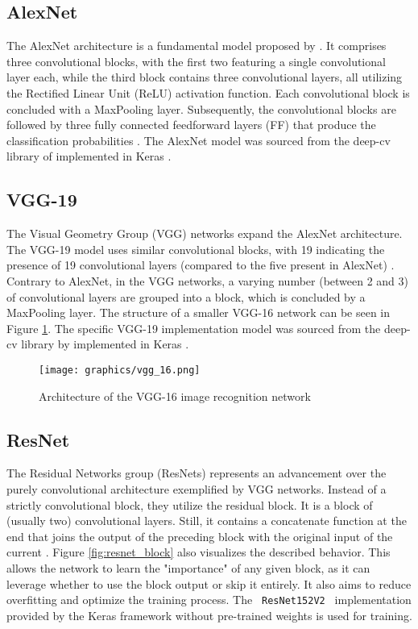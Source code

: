 \documentclass[draft,final]{vutinfth} %
\begin{document}
\subsection{AlexNet}
The AlexNet architecture is a fundamental model proposed by \citeauthor{krizhevsky_imagenet_2012}. It comprises three convolutional blocks, with the first two featuring a single convolutional layer each, while the third block contains three convolutional layers, all utilizing the Rectified Linear Unit (ReLU) activation function. Each convolutional block is concluded with a MaxPooling layer. Subsequently, the convolutional blocks are followed by three fully connected feedforward layers (FF) that produce the classification probabilities \cite{krizhevsky_imagenet_2012}.
The AlexNet model was sourced from the deep-cv library of \citeauthor{weill_keras-deepcv_2017} \cite{weill_keras-deepcv_2017} implemented in Keras \cite{chollet_keras_2015}.

\subsection{VGG-19}
The Visual Geometry Group (VGG) networks expand the AlexNet architecture. The VGG-19 model uses similar convolutional blocks, with 19 indicating the presence of 19 convolutional layers (compared to the five present in AlexNet) \cite{simonyan_very_2015}. 
Contrary to AlexNet, in the VGG networks, a varying number (between 2 and 3) of convolutional layers are grouped into a block, which is concluded by a MaxPooling layer.
The structure of a smaller VGG-16 network can be seen in Figure \ref{fig:vgg16}.
The specific VGG-19 implementation model was sourced from the deep-cv library by \citeauthor{weill_keras-deepcv_2017} \cite{weill_keras-deepcv_2017} implemented in Keras \cite{chollet_keras_2015}.

\begin{figure}
    \centering
    \texttt{[image: graphics/vgg\_16.png]}
    \caption{Architecture of the VGG-16 image recognition network \cite{simonyan_very_2015, bangar_vgg-net_2022}}
    \label{fig:vgg16}
\end{figure}

\subsection{ResNet} \label{sec:meth_resnet}
The Residual Networks group (ResNets) represents an advancement over the purely convolutional architecture exemplified by VGG networks. Instead of a strictly convolutional block, they utilize the residual block. It is a block of (usually two) convolutional layers. Still, it contains a concatenate function at the end that joins the output of the preceding block with the original input of the current \cite{he_deep_2015}. Figure \ref{fig:resnet_block} also visualizes the described behavior. This allows the network to learn the "importance" of any given block, as it can leverage whether to use the block output or skip it entirely. It also aims to reduce overfitting and optimize the training process.
The \verb | ResNet152V2 | implementation provided by the Keras framework \cite{chollet_keras_2015} without pre-trained weights is used for training.
\end{document}
